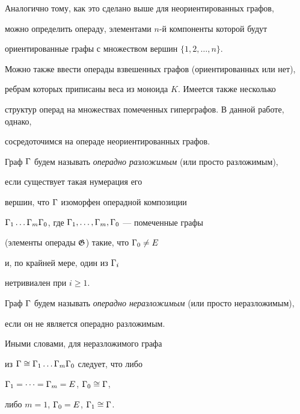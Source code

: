 \begin{note}


Аналогично тому, как это сделано выше для неориентированных графов, 


можно определить операду, элементами $n$-й компоненты которой будут 


ориентированные графы с множеством вершин $\{ 1, 2,\dotsc ,n\}$.


Можно также ввести операды взвешенных графов (ориентированных или нет), 


ребрам которых приписаны веса из моноида $K$. Имеется также несколько 


структур операд на множествах помеченных гиперграфов. В данной работе, однако, 


сосредоточимся на операде неориентированных графов. 


\end{note}











\begin{defn}


Граф ${\Gamma}$ будем называть {\it операдно разложимым} (или просто разложимым), 


если существует такая нумерация его


вершин, что ${\Gamma}$ изоморфен операдной композиции 


${\Gamma}_1\dotsc {\Gamma}_m{\Gamma}_0$, где ${\Gamma}_1,\dotsc ,{\Gamma}_m,{\Gamma}_0$ --- помеченные графы


(элементы операды ${\frak G}$) такие, что ${\Gamma}_0\ne E$ 


и, по крайней мере, один из ${\Gamma}_i$


нетривиален при $i\geq1$.





Граф ${\Gamma}$ будем называть {\it операдно неразложимым} (или просто неразложимым), 


если он не является операдно разложимым.


Иными словами, для неразложимого графа


из ${\Gamma}\cong{\Gamma}_1\dotsc {\Gamma}_m{\Gamma}_0$ следует, что либо


${\Gamma}_1=\dotsb ={\Gamma}_m=E$, ${\Gamma}_0\cong{\Gamma}$,


либо $m=1$, ${\Gamma}_0=E$, ${\Gamma}_1\cong{\Gamma}$.


\end{defn}





